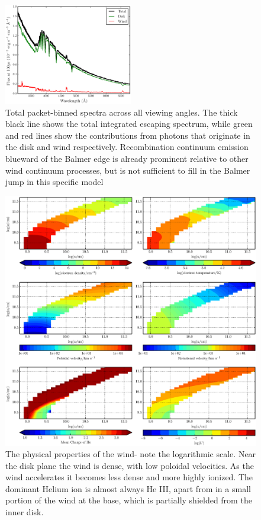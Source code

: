 \documentclass[preprint, a4paper, 11pt]{aastex}
\begin{document}
\begin{figure} 
\includegraphics[width=0.5\textwidth]{figures/fig7_escaping.eps}
\caption{Total packet-binned spectra across all viewing angles. 
The thick black line shows the total 
integrated escaping spectrum, while green and red lines show the contributions from photons that originate
in the disk and wind respectively. Recombination continuum emission blueward of the Balmer 
edge is already prominent relative to other wind continuum processes, but is not sufficient
to fill in the Balmer jump in this specific model}
\label{cont}
\end{figure} 



\begin{figure} %
\includegraphics[width=\textwidth]{figures/fig5.eps}
\caption{
The physical properties of the wind- note the logarithmic scale. 
Near the disk plane the wind is dense, with low poloidal velocities.
As the wind accelerates it becomes less dense
and more highly ionized. The dominant Helium ion
is almost always He III, apart from in a small
portion of the wind at the base, which is partially shielded
from the inner disk.
}
\label{wind}
\end{figure} %
\end{document}
